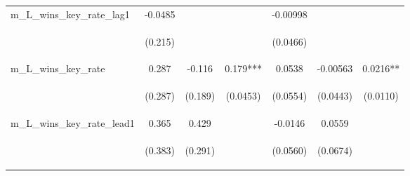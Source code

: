 \documentclass[]{article}
\begin{document}
\begin{center}
\begin{tabular}{lcccccc}
m\_L\_wins\_key\_rate\_lag1 & -0.0485 &  &  & -0.00998 &  &  \\
\vspace{4pt} & \begin{footnotesize}(0.215)\end{footnotesize} & \begin{footnotesize}\end{footnotesize} & \begin{footnotesize}\end{footnotesize} & \begin{footnotesize}(0.0466)\end{footnotesize} & \begin{footnotesize}\end{footnotesize} & \begin{footnotesize}\end{footnotesize} \\
m\_L\_wins\_key\_rate & 0.287 & -0.116 & 0.179*** & 0.0538 & -0.00563 & 0.0216** \\
\vspace{4pt} & \begin{footnotesize}(0.287)\end{footnotesize} & \begin{footnotesize}(0.189)\end{footnotesize} & \begin{footnotesize}(0.0453)\end{footnotesize} & \begin{footnotesize}(0.0554)\end{footnotesize} & \begin{footnotesize}(0.0443)\end{footnotesize} & \begin{footnotesize}(0.0110)\end{footnotesize} \\
m\_L\_wins\_key\_rate\_lead1 & 0.365 & 0.429 &  & -0.0146 & 0.0559 &  \\
\vspace{4pt} & \begin{footnotesize}(0.383)\end{footnotesize} & \begin{footnotesize}(0.291)\end{footnotesize} & \begin{footnotesize}\end{footnotesize} & \begin{footnotesize}(0.0560)\end{footnotesize} & \begin{footnotesize}(0.0674)\end{footnotesize} & \begin{footnotesize}\end{footnotesize} \\

\end{tabular}
\end{center}
\end{document}
